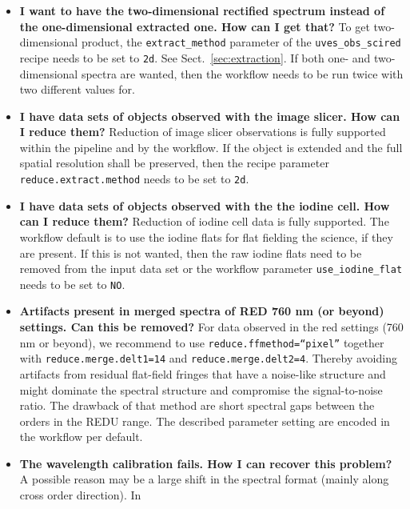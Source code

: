 \begin{itemize}
    It can, however, not be guaranteed that the chosen reduction strategy is appropriate in this case.
    \item \textbf{I want to have the two-dimensional rectified spectrum instead of the one-dimensional
    extracted one. How can I get that?}
    To get two-dimensional product, the {\tt extract\_method} parameter of the
    {\tt uves\_obs\_scired} recipe needs to be set to {\tt 2d}. See Sect.~\ref{sec:extraction}. 
    If both one- and two-dimensional spectra are wanted, then the workflow needs to be run twice
    with two different values for.
    \item \textbf{I have data sets of objects observed with the image slicer. How can I reduce them?}
    Reduction of image slicer observations is fully supported within the pipeline and by the 
    workflow. If the object is extended and the full spatial resolution shall be preserved,
    then the recipe parameter {\tt reduce.extract.method} needs to be set to {\tt 2d}.
    \item \textbf{I have data sets of objects observed with the the iodine cell. How can I reduce them?}
    Reduction of iodine cell data is fully supported. The workflow default is to use the iodine
    flats for flat fielding the science, if they are present. If this is not wanted, then the 
    raw iodine flats need to be removed from the input data set or the workflow parameter
    {\tt use\_iodine\_flat} needs to be set to {\tt NO}.
    \item \textbf{Artifacts present in merged spectra of RED 760 nm (or beyond) settings. 
    Can this be removed?} 
    For data observed in the red settings (760 nm or beyond), we recommend to use \newline
    {\tt reduce.ffmethod=“pixel”} together with {\tt reduce.merge.delt1=14} and \newline
    {\tt reduce.merge.delt2=4}. Thereby avoiding
    artifacts from residual flat-field fringes that have a noise-like structure and might
    dominate the spectral structure and compromise the signal-to-noise ratio. The drawback of that method
    are short spectral gaps between the orders in the REDU range. 
    The described parameter setting are encoded in the workflow per default.
    \item \textbf{The wavelength calibration fails. How I can recover this problem?}
    A possible reason may be a large shift in the spectral format (mainly along cross order direction). In

\end{itemize}
